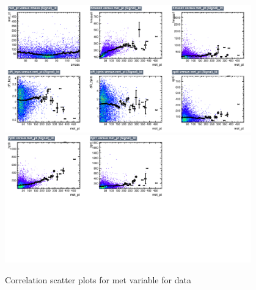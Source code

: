 \begin{figure}[!htb]%
\centering
\includegraphics[width=0.95\textwidth]{figures/CRDY/dataset/plots/correlationscatter_met_pt__Id_c1.pdf}
\includegraphics[width=0.95\textwidth]{figures/CRDY/dataset/plots/correlationscatter_met_pt__Id_c2.pdf}
\caption{ Correlation scatter plots for met variable for data}%
\label{fig:correlations_CRDY_met_pt_S}                                                       
\end{figure}



